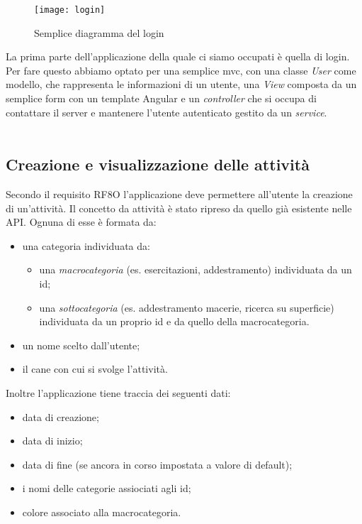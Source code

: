 \begin{wrapfigure}{l}{0.45\textwidth}
  \texttt{[image: login]} 
  \caption{Semplice diagramma del login}
  \label{fig:login}
\end{wrapfigure}

La prima parte dell'applicazione della quale ci siamo occupati è quella di login. Per fare questo abbiamo optato per una semplice \acrlong{mvc}, con
una classe \textit{User} come modello, che rappresenta le informazioni di un utente, una \textit{View} composta da un semplice form con un
template Angular e un \textit{controller} che si occupa di contattare il server e mantenere l'utente autenticato gestito da un
\textit{service}. \\ \\

\subsection{Creazione e visualizzazione delle attività}
Secondo il requisito RF8O l'applicazione deve permettere all'utente la creazione di un'attività. Il concetto da attività è stato ripreso da
quello già esistente nelle API. Ognuna di esse è formata da:
\begin{itemize}
  \item una categoria individuata da: 
  \begin{itemize}
    \item una \textit{macrocategoria} (es. esercitazioni, addestramento) individuata da un id;
    \item una \textit{sottocategoria} (es. addestramento macerie, ricerca su superficie) individuata da un proprio id e da quello della macrocategoria.
  \end{itemize}
  \item un nome scelto dall'utente;
  \item il cane con cui si svolge l'attività.
\end{itemize}
Inoltre l'applicazione tiene traccia dei seguenti dati:
\begin{itemize}
  \item data di creazione;
  \item data di inizio;
  \item data di fine (se ancora in corso impostata a valore di default);
  \item i nomi delle categorie assiociati agli id;
  \item colore associato alla macrocategoria.
\end{itemize}

